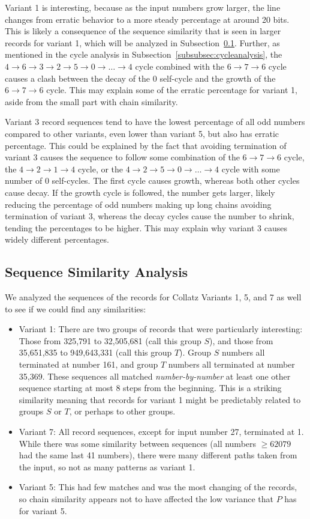 Variant 1 is interesting, because as the input numbers grow larger, the line changes from erratic behavior to a more steady percentage at around 20 bits. This is likely a consequence of the sequence similarity that is seen in larger records for variant 1, which will be analyzed in Subsection~\ref{subsubsec:algseqsim}. Further, as mentioned in the cycle analysis in Subsection~\ref{subsubsec:cycleanalysis}, the $4 \rightarrow 6 \rightarrow 3 \rightarrow 2 \rightarrow 5 \rightarrow 0 \rightarrow \ldots \rightarrow 4$ cycle combined with the  $6 \rightarrow 7 \rightarrow 6$ cycle causes a clash between the decay of the 0 self-cycle and the growth of the $6 \rightarrow 7 \rightarrow 6$ cycle. This may explain some of the erratic percentage for variant 1, aside from the small part with chain similarity. \par
Variant 3 record sequences tend to have the lowest percentage of all odd numbers compared to other variants, even lower than variant 5, but also has erratic percentage. This could be explained by the fact that avoiding termination of variant 3 causes the sequence to follow some combination of the $6 \rightarrow 7 \rightarrow 6$ cycle, the $4 \rightarrow 2 \rightarrow 1 \rightarrow 4$ cycle, or the $4 \rightarrow 2 \rightarrow 5 \rightarrow 0  \rightarrow \ldots \rightarrow 4$ cycle with some number of $0$ self-cycles. The first cycle causes growth, whereas both other cycles cause decay. If the growth cycle is followed, the number gets larger, likely reducing the percentage of odd numbers making up long chains avoiding termination of variant 3, whereas the decay cycles cause the number to shrink, tending the percentages to be higher. This may explain why variant 3 causes widely different percentages.
\subsection{Sequence Similarity Analysis} \label{subsubsec:algseqsim}
We analyzed the sequences of the records for Collatz Variants 1, 5, and 7 as well to see if we could find any similarities:
\begin{itemize}
    \item Variant 1: There are two groups of records that were particularly interesting: Those from 325,791 to 32,505,681 (call this group $S$), and those from 35,651,835 to 949,643,331 (call this group $T$). Group $S$ numbers all terminated at number 161, and group $T$ numbers all terminated at number 35,369. These sequences all matched \textit{number-by-number} at least one other sequence starting at most 8 steps from the beginning. This is a striking similarity meaning that records for variant 1 might be predictably related to groups $S$ or $T$, or perhaps to other groups.
    \item Variant 7: All record sequences, except for input number 27, terminated at 1. While there was some similarity between sequences (all numbers $\geq 62079$ had the same last 41 numbers), there were many different paths taken from the input, so not as many patterns as variant 1.
    \item Variant 5: This had few matches and was the most changing of the records, so chain similarity appears not to have affected the low variance that $P$ has for variant 5.
\end{itemize}

